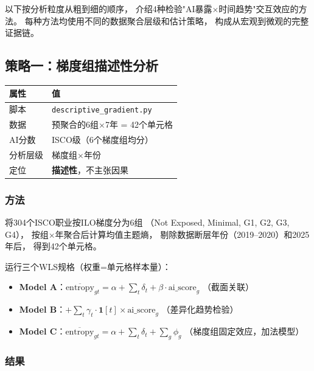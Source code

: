\documentclass[12pt,a4paper]{ctexart}
\begin{document}
以下按分析粒度从粗到细的顺序，
介绍4种检验"AI暴露$\times$时间趋势"交互效应的方法。
每种方法均使用不同的数据聚合层级和估计策略，
构成从宏观到微观的完整证据链。

\subsection{策略一：梯度组描述性分析}
\label{subsec:gradient}

\begin{table}[h!]
\centering
\small
\begin{tabular}{ll}
\toprule
\textbf{属性} & \textbf{值} \\
\midrule
脚本 & \texttt{descriptive\_gradient.py} \\
数据 & 预聚合的6组$\times$7年 = 42个单元格 \\
AI分数 & ISCO级（6个梯度组均分） \\
分析层级 & 梯度组$\times$年份 \\
定位 & \textbf{描述性}，不主张因果 \\
\bottomrule
\end{tabular}
\end{table}

\subsubsection{方法}

将304个ISCO职业按ILO梯度分为6组
（Not Exposed, Minimal, G1, G2, G3, G4），
按组$\times$年聚合后计算均值主题熵，
剔除数据断层年份（2019--2020）和2025年后，
得到42个单元格。

运行三个WLS规格（权重=单元格样本量）：

\begin{itemize}
\item \textbf{Model A}：$\overline{\text{entropy}}_{gt} = \alpha
      + \sum_t \delta_t + \beta \cdot \text{ai\_score}_g$
      \quad （截面关联）
\item \textbf{Model B}：$+\sum_t \gamma_t \cdot \mathbf{1}[t] \times \text{ai\_score}_g$
      \quad （差异化趋势检验）
\item \textbf{Model C}：$\overline{\text{entropy}}_{gt} = \alpha
      + \sum_t \delta_t + \sum_g \phi_g$
      \quad （梯度组固定效应，加法模型）
\end{itemize}

\subsubsection{结果}
\end{document}
